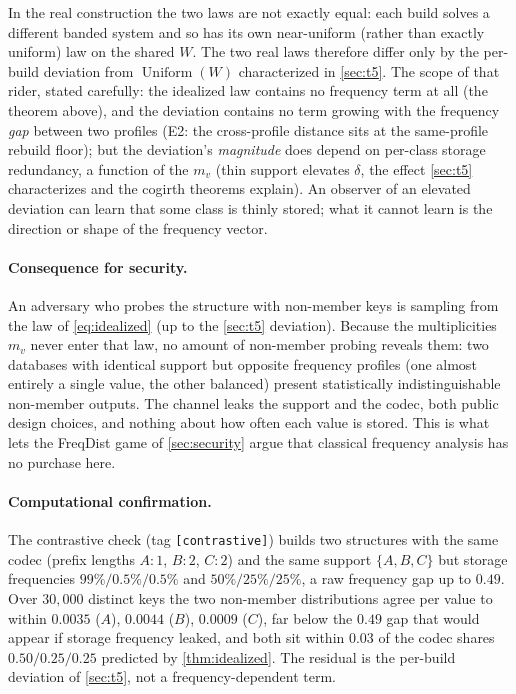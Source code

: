 \documentclass[11pt]{article}
\theoremstyle{definition}
\theoremstyle{plain}
\theoremstyle{remark}
\DeclareMathOperator{\Uniform}{Uniform}
\newcommand{\W}{W}                          %
\begin{document}
In the real construction the two laws are not exactly equal: each build solves a
different banded system and so has its own near-uniform (rather than exactly uniform)
law on the shared $\W$. The two real laws therefore differ only by the per-build
deviation from $\Uniform(\W)$ characterized in \cref{sec:t5}. The scope of that rider,
stated carefully: the idealized law contains no frequency term at all (the theorem
above), and the deviation contains no term growing with the frequency \emph{gap}
between two profiles (E2: the cross-profile distance sits at the same-profile rebuild
floor); but the deviation's \emph{magnitude} does depend on per-class storage
redundancy, a function of the $m_v$ (thin support elevates $\delta$, the effect
\cref{sec:t5} characterizes and the cogirth theorems explain). An observer of an
elevated deviation can learn that some class is thinly stored; what it cannot learn is
the direction or shape of the frequency vector.

\paragraph{Consequence for security.}
An adversary who probes the structure with non-member keys is sampling from the law of
\eqref{eq:idealized} (up to the \cref{sec:t5} deviation). Because the multiplicities
$m_v$ never enter that law, no amount of non-member probing reveals them: two databases
with identical support but opposite frequency profiles (one almost entirely a single
value, the other balanced) present statistically indistinguishable non-member outputs.
The channel leaks the support and the codec, both public design choices, and nothing
about how often each value is stored. This is what lets the FreqDist game of
\cref{sec:security} argue that classical frequency analysis has no purchase here.

\paragraph{Computational confirmation.}
The contrastive check (tag \texttt{[contrastive]}) builds two structures with the same
codec (prefix lengths $A{:}1$, $B{:}2$, $C{:}2$) and the same support $\{A,B,C\}$ but
storage frequencies $99\% / 0.5\% / 0.5\%$ and $50\% / 25\% / 25\%$, a raw frequency
gap up to $0.49$. Over $30{,}000$ distinct keys the two non-member distributions agree
per value to within $0.0035$ ($A$), $0.0044$ ($B$), $0.0009$ ($C$), far below the
$0.49$ gap that would appear if storage frequency leaked, and both sit within $0.03$ of
the codec shares $0.50 / 0.25 / 0.25$ predicted by \cref{thm:idealized}. The residual
is the per-build deviation of \cref{sec:t5}, not a frequency-dependent term.
\end{document}
